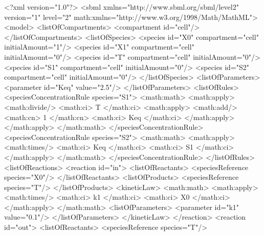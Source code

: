 \documentclass[10pt,twocolumntoc]{cekarticle}
\begin{document}
\begin{example}
<?xml version="1.0"?>
<sbml xmlns="http://www.sbml.org/sbml/level2" version="1" level="2"
      math:xmlns="http://www.w3.org/1998/Math/MathML">
    <model>
        <listOfCompartments>
            <compartment id="cell"/>
        </listOfCompartments>
        <listOfSpecies>
            <species id="X0" compartment="cell" initialAmount="1"/>
            <species id="X1" compartment="cell" initialAmount="0"/>
            <species id="T" compartment="cell" initialAmount="0"/>
            <species id="S1" compartment="cell" initialAmount="0"/>
            <species id="S2" compartment="cell" initialAmount="0"/>
        </listOfSpecies>
        <listOfParameters>
            <parameter id="Keq" value="2.5"/>
        </listOfParameters>
        <listOfRules>
            <speciesConcentrationRule species="S1">
                <math:math>
                    <math:apply>
                        <math:divide/>
                        <math:ci> T </math:ci>
                        <math:apply>
                            <math:add/>
                            <math:cn> 1 </math:cn>
                            <math:ci> Keq </math:ci>
                        </math:apply>
                    </math:apply>
                </math:math>
            </speciesConcentrationRule>
            <speciesConcentrationRule species="S2">
                <math:math>
                    <math:apply>
                        <math:times/>
                        <math:ci> Keq </math:ci>
                        <math:ci> S1 </math:ci>
                    </math:apply>
                </math:math>
            </speciesConcentrationRule>
        </listOfRules>
        <listOfReactions>
            <reaction id="in">
                <listOfReactants>
                    <speciesReference species="X0"/>
                </listOfReactants>
                <listOfProducts>
                    <speciesReference species="T"/>
                </listOfProducts>
                <kineticLaw>
                    <math:math>
                        <math:apply>
                            <math:times/>
                            <math:ci> k1 </math:ci>
                            <math:ci> X0 </math:ci>
                        </math:apply>
                    </math:math>
                    <listOfParameters>
                        <parameter id="k1" value="0.1"/>
                    </listOfParameters>
                </kineticLaw>
            </reaction>
            <reaction id="out">
                <listOfReactants>
                    <speciesReference species="T"/>

\end{example}
\end{document}
